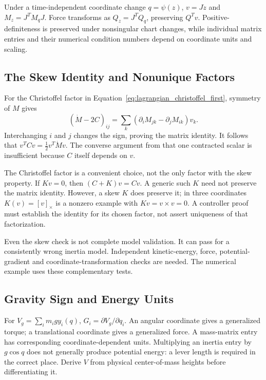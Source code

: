 Under a time-independent coordinate change $q=\psi(z)$, $v=J\dot z$ and $M_z=J^TM_qJ$. Force transforms as $Q_z=J^TQ_q$, preserving $Q^Tv$. Positive-definiteness is preserved under nonsingular chart changes, while individual matrix entries and their numerical condition numbers depend on coordinate units and scaling.

\subsection{The Skew Identity and Nonunique Factors}
\label{subsec:lagrangian_coriolis}

For the Christoffel factor in Equation~\ref{eq:lagrangian_christoffel_first}, symmetry of $M$ gives
\begin{equation}
(\dot M-2C)_{ij}
=\sum_k(\partial_iM_{jk}-\partial_jM_{ik})v_k.
\label{eq:lagrangian_skew}
\end{equation}
Interchanging $i$ and $j$ changes the sign, proving the matrix identity. It follows that $v^TCv=\tfrac12v^T\dot Mv$. The converse argument from that one contracted scalar is insufficient because $C$ itself depends on $v$.

The Christoffel factor is a convenient choice, not the only factor with the skew property. If $Kv=0$, then $(C+K)v=Cv$. A generic such $K$ need not preserve the matrix identity. However, a skew $K$ does preserve it; in three coordinates $K(v)=[v]_\times$ is a nonzero example with $Kv=v\times v=0$. A controller proof must establish the identity for its chosen factor, not assert uniqueness of that factorization.

Even the skew check is not complete model validation. It can pass for a consistently wrong inertia model. Independent kinetic-energy, force, potential-gradient and coordinate-transformation checks are needed. The numerical example uses these complementary tests.

\subsection{Gravity Sign and Energy Units}
\label{subsec:lagrangian_gravity}

For $V_g=\sum_i m_i g y_i(q)$, $G_i=\partial V_g/\partial q_i$. An angular coordinate gives a generalized torque; a translational coordinate gives a generalized force. A mass-matrix entry has corresponding coordinate-dependent units. Multiplying an inertia entry by $g\cos q$ does not generally produce potential energy: a lever length is required in the correct place. Derive $V$ from physical center-of-mass heights before differentiating it.

